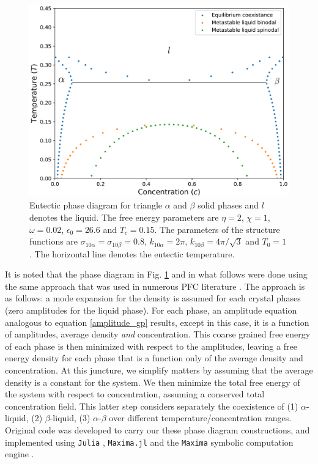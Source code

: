 \documentclass[showkeys, prb, reprint]{revtex4-1}
\begin{document}
\begin{figure}[h]
    \includegraphics[scale=0.45]{eutectic}
    \caption[Eutectic Phase Diagram]{
        \label{eutectic} Eutectic phase diagram for triangle $\alpha$ and
        $\beta$ solid phases and $l$ denotes the liquid. The free energy
        parameters are $\eta = 2$, $\chi = 1$, $\omega=0.02$, $\epsilon_0 =
        26.6$ and $T_c = 0.15$. The parameters of the structure functions are
        $\sigma_{10\alpha} = \sigma_{10\beta} = 0.8$, $k_{10\alpha} = 2\pi$,
        $k_{10\beta} = 4\pi/\sqrt{3}$ and $T_0 = 1$. The horizontal line
        denotes the eutectic temperature.
    }
\end{figure}

It is noted that the phase diagram in Fig. \ref{eutectic} and in what follows
were done using the same approach that was used in numerous PFC literature
\cite{GREENWOOD11_BINARY}. The approach is as follows: a mode expansion for the
density is assumed for each crystal phases (zero amplitudes for the liquid
phase). For each  phase, an amplitude equation analogous to equation
\ref{amplitude_gp} results, except in this case, it is a function of
amplitudes, average density {\it and} concentration. This coarse grained free
energy of each phase is then minimized with respect to the amplitudes, leaving
a free energy density for each phase that is a function only of the average
density and concentration. At this juncture, we simplify matters by assuming
that the average density is a constant for the system. We then minimize the
total free energy of the system with respect to concentration, assuming a
conserved total concentration field. This latter step considers separately the
coexistence of  (1) $\alpha$-liquid, (2)  $\beta$-liquid, (3) $\alpha$-$\beta$
over different temperature/concentration ranges. Original code was developed to
carry our these phase diagram constructions, and implemented using
\texttt{Julia} \cite{JULIA}, \texttt{Maxima.jl} \cite{MAXIMAJL} and the
\texttt{Maxima} symbolic computation engine \cite{MAXIMA}.  
\end{document}
